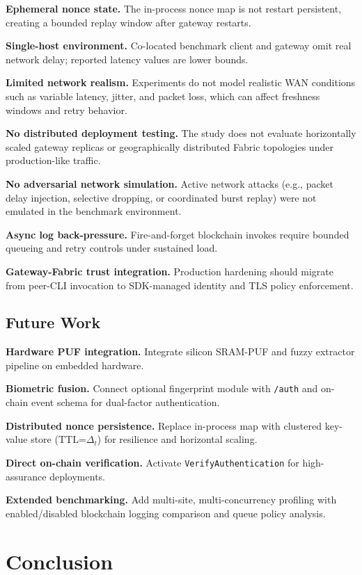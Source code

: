 \documentclass[conference]{IEEEtran}
\begin{document}
\textbf{Ephemeral nonce state.} The in-process nonce map is not restart
persistent, creating a bounded replay window after gateway restarts.

\textbf{Single-host environment.} Co-located benchmark client and gateway omit
real network delay; reported latency values are lower bounds.

\textbf{Limited network realism.} Experiments do not model realistic WAN
conditions such as variable latency, jitter, and packet loss, which can affect
freshness windows and retry behavior.

\textbf{No distributed deployment testing.} The study does not evaluate
horizontally scaled gateway replicas or geographically distributed Fabric
topologies under production-like traffic.

\textbf{No adversarial network simulation.} Active network attacks (e.g.,
packet delay injection, selective dropping, or coordinated burst replay) were
not emulated in the benchmark environment.

\textbf{Async log back-pressure.} Fire-and-forget blockchain invokes require
bounded queueing and retry controls under sustained load.

\textbf{Gateway-Fabric trust integration.} Production hardening should migrate
from peer-CLI invocation to SDK-managed identity and TLS policy enforcement.

\subsection{Future Work}

\textbf{Hardware PUF integration.} Integrate silicon SRAM-PUF and fuzzy
extractor pipeline on embedded hardware.

\textbf{Biometric fusion.} Connect optional fingerprint module with
\texttt{/auth} and on-chain event schema for dual-factor authentication.

\textbf{Distributed nonce persistence.} Replace in-process map with clustered
key-value store (TTL=$\Delta_t$) for resilience and horizontal scaling.

\textbf{Direct on-chain verification.} Activate \texttt{VerifyAuthentication}
for high-assurance deployments.

\textbf{Extended benchmarking.} Add multi-site, multi-concurrency profiling
with enabled/disabled blockchain logging comparison and queue policy analysis.

\section{Conclusion}
\label{sec:conclusion}
\end{document}
